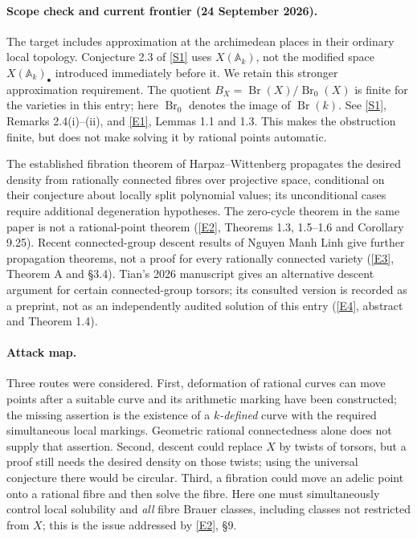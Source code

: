 \documentclass[11pt]{article}
\newcommand{\A}{\mathbb{A}}
\newcommand{\sref}[2]{\hyperlink{source:#1:#2}{[S#2]}}
\newcommand{\eref}[2]{\hyperlink{extra:#1:#2}{[E#2]}}
\begin{document}
\paragraph{Scope check and current frontier (24 September 2026).}
The target includes approximation at the archimedean places in their ordinary
local topology.  Conjecture 2.3 of \sref{statement}{1} uses $X(\A_k)$, not the modified
space $X(\A_k)_\bullet$ introduced immediately before it.  We retain this stronger
approximation requirement.  The quotient
$B_X=\operatorname{Br}(X)/\operatorname{Br}_0(X)$ is finite for the varieties in
this entry; here $\operatorname{Br}_0$ denotes the image of
$\operatorname{Br}(k)$.  See \sref{statement}{1}, Remarks 2.4(i)--(ii), and
\eref{statement}{1}, Lemmas 1.1 and 1.3.
This makes the obstruction finite, but does not make solving it by rational
points automatic.

The established fibration theorem of Harpaz--Wittenberg propagates the desired
density from rationally connected fibres over projective space, conditional on
their conjecture about locally split polynomial values; its unconditional cases
require additional degeneration hypotheses.  The zero-cycle theorem in the
same paper is not a rational-point theorem
(\eref{statement}{2}, Theorems 1.3, 1.5--1.6 and Corollary 9.25).
Recent connected-group descent results of Nguyen Manh Linh give further
propagation theorems, not a proof for every rationally connected variety
(\eref{statement}{3}, Theorem A and \S3.4).
Tian's 2026 manuscript gives an alternative descent argument for certain
connected-group torsors; its consulted version is recorded as a preprint, not
as an independently audited solution of this entry (\eref{statement}{4}, abstract
and Theorem 1.4).

\paragraph{Attack map.}
Three routes were considered.  First, deformation of rational curves can move
points after a suitable curve and its arithmetic marking have been constructed;
the missing assertion is the existence of a \emph{$k$-defined} curve with the
required simultaneous local markings.  Geometric rational connectedness alone
does not supply that assertion.  Second, descent could replace $X$ by twists
of torsors, but a proof still needs the desired density on those twists; using
the universal conjecture there would be circular.  Third, a fibration could
move an adelic point onto a rational fibre and then solve the fibre.  Here one
must simultaneously control local solubility and \emph{all} fibre Brauer
classes, including classes not restricted from $X$; this is the issue addressed
by \eref{statement}{2}, \S9.
\end{document}
